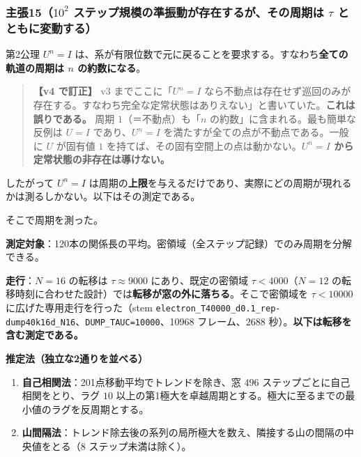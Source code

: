 \documentclass[
  10pt,
]{ltjsarticle}
\providecommand{\tightlist}{%
  \setlength{\itemsep}{0pt}\setlength{\parskip}{0pt}}
\begin{document}
\subsubsection{\texorpdfstring{主張15（\(10^2\)
ステップ規模の準振動が存在するが、その周期は \(\tau\)
とともに変動する）}{主張15（10\^{}2 ステップ規模の準振動が存在するが、その周期は \textbackslash tau とともに変動する）}}\label{ux4e3bux5f3515102-ux30b9ux30c6ux30c3ux30d7ux898fux6a21ux306eux6e96ux632fux52d5ux304cux5b58ux5728ux3059ux308bux304cux305dux306eux5468ux671fux306f-tau-ux3068ux3068ux3082ux306bux5909ux52d5ux3059ux308b}

第2公理 \(U^n = I\)
は、系が有限位数で元に戻ることを要求する。すなわち\textbf{全ての軌道の周期は
\(n\) の約数になる}。

\begin{quote}
\textbf{【v4 で訂正】} v3 までここに「\(U^n=I\)
なら不動点は存在せず巡回のみが存在する。すなわち完全な定常状態はありえない」と書いていた。\textbf{これは誤りである。}
周期 \(1\)（＝不動点）も「\(n\) の約数」に含まれる。最も簡単な反例は
\(U = I\) であり、\(U^n = I\) を満たすが全ての点が不動点である。一般に
\(U\) が固有値 \(1\)
を持てば、その固有空間上の点は動かない。\textbf{\(U^n = I\)
から定常状態の非存在は導けない。}
\end{quote}

したがって \(U^n = I\)
は周期の\textbf{上限}を与えるだけであり、実際にどの周期が現れるかは測るしかない。以下はその測定である。

そこで周期を測った。

\textbf{測定対象}：120本の関係長の平均。密領域（全ステップ記録）でのみ周期を分解できる。

\textbf{走行}：\(N=16\) の転移は \(\tau\approx9000\)
にあり、既定の密領域 \(\tau<4000\)（\(N=12\)
の転移時刻に合わせた設計）では\textbf{転移が窓の外に落ちる}。そこで密領域を
\(\tau<10000\) に広げた専用走行を行った（stem
\texttt{electron\_T40000\_d0.1\_rep-dump40k16d\_N16}、\texttt{DUMP\_TAUC=10000}、10968
フレーム、2688 秒）。\textbf{以下は転移を含む測定である。}

\textbf{推定法（独立な2通りを並べる）}

\begin{enumerate}
\def\labelenumi{\arabic{enumi}.}
\tightlist
\item
  \textbf{自己相関法}：201点移動平均でトレンドを除き、窓 \(496\)
  ステップごとに自己相関をとり、ラグ \(10\)
  以上の第1極大を卓越周期とする。極大に至るまでの最小値のラグを反周期とする。
\item
  \textbf{山間隔法}：トレンド除去後の系列の局所極大を数え、隣接する山の間隔の中央値をとる（\(8\)
  ステップ未満は除く）。
\end{enumerate}
\end{document}
